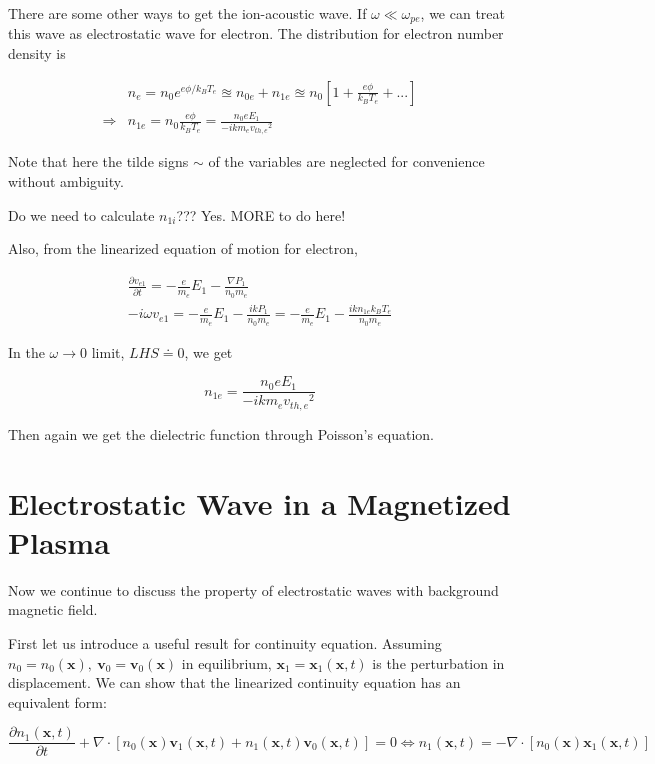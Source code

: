 \documentclass[
  notoc %
]{tufte-book}
\begin{document}
There are some other ways to get the ion-acoustic wave. If
\(\omega\ll \omega_{pe}\), we can treat this wave as electrostatic wave
for electron. The distribution for electron number density is

\[
\begin{aligned}
&n_{e}=n_0e^{e\phi/k_B T_e}\approxeq n_{0e}+n_{1e} \approxeq n_0[1+\frac{e\phi}{k_BT_e}+...] \\
\Rightarrow &n_{1e}=n_0\frac{e\phi}{k_BT_e}=\frac{n_0eE_1}{-ikm_e{v_{th,e}}^2}
\end{aligned}
\]

Note that here the tilde signs \(\sim\) of the variables are neglected
for convenience without ambiguity.

Do we need to calculate \(n_{1i}\)??? Yes. MORE to do here!

Also, from the linearized equation of motion for electron,

\[
\begin{aligned}
\frac{\partial v_{e1}}{\partial t}=-\frac{e}{m_e}E_1-\frac{\nabla P_1}{n_0m_e} \\
-i\omega v_{e1}=-\frac{e}{m_e}E_1-\frac{ik P_1}{n_0m_e}=-\frac{e}{m_e}E_1-\frac{ik n_{1e}k_BT_e}{n_0m_e}
\end{aligned}
\]

In the \(\omega\rightarrow 0\) limit, \(LHS\doteq0\), we get

\[
n_{1e}= \frac{n_0eE_1}{-ikm_e{v_{th,e}}^2}
\]

Then again we get the dielectric function through Poisson's equation.

\hypertarget{sec:es_wave_magnetized}{%
\section{Electrostatic Wave in a Magnetized
Plasma}\label{sec:es_wave_magnetized}}

Now we continue to discuss the property of electrostatic waves with
background magnetic field.

First let us introduce a useful result for continuity equation. Assuming
\(n_0=n_0(\mathbf{x}),\ \mathbf{v}_0=\mathbf{v}_0(\mathbf{x})\) in
equilibrium, \(\mathbf{x}_1=\mathbf{x}_1(\mathbf{x},t)\) is the
perturbation in displacement. We can show that the linearized continuity
equation has an equivalent form:

\[
\frac{\partial n_1(\mathbf{x},t)}{\partial t}+\nabla\cdot[ n_0(\mathbf{x})\mathbf{v}_1(\mathbf{x},t)+n_1(\mathbf{x},t)\mathbf{v}_0(\mathbf{x},t)]=0
\Leftrightarrow n_1(\mathbf{x},t)=-\nabla\cdot[n_0(\mathbf{x})\mathbf{x}_1(\mathbf{x},t)]
\]
\end{document}
